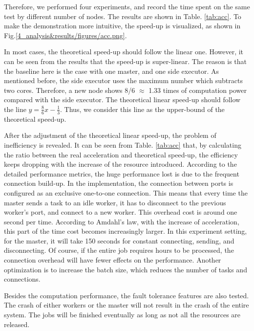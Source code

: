 Therefore, we performed four experiments, and record the time spent on the same test by different number of nodes. The results are shown in Table.  \ref{tab:acc}. To make the demonstration  more intuitive, the speed-up is visualized, as shown in Fig.\ref{4_analysis&results/figures/acc.png}.

In most cases, the theoretical speed-up should follow the linear one.
However, it can be seen from the results that the speed-up is super-linear.
The reason is that the baseline here is the case with one master, and one side executor.
As mentioned before, the side executor uses the maximum number which subtracts two cores.
Therefore, a new node shows 8/6 $\approx$ 1.33 times of computation power compared with the side executor.  
The theoretical linear speed-up should follow the line  $y=\frac{8}{6}x-\frac{1}{3}$.
Thus, we consider this line as the upper-bound of the theoretical speed-up.

After the adjustment of the theoretical linear speed-up, the problem of inefficiency is revealed.
It can be seen from Table. \ref{tab:acc} that, by calculating the ratio between the real acceleration and theoretical speed-up, the efficiency keeps dropping with the increase of the resource introduced.
According to the detailed performance metrics, the huge performance lost is due to the frequent connection build-up. 
In the implementation, the connection between ports is configured as an exclusive one-to-one connection.
This means that every time the master sends a task to an idle worker, it has to disconnect to the previous worker’s port, and connect to a new worker.
This overhead cost is around one second per time.
According to Amdahl’s law, with the increase of acceleration, this part of the time cost becomes increasingly larger.
In this experiment setting, for the master, it will take 150 seconds for constant connecting, sending, and disconnecting.
Of course, if the entire job requires hours to be processed, the connection overhead will have fewer effects on the performance.
Another optimization is to increase the batch size, which reduces the number of tasks and connections.


Besides the computation performance, the fault tolerance features are also tested.
The crash of either workers or the master will not result in the crash of the entire system.
The jobs will be finished eventually as long as not all the resources are released.

